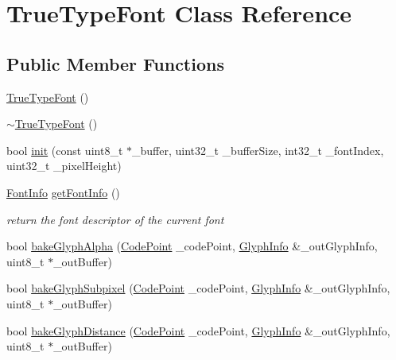 \hypertarget{class_true_type_font}{\section{True\+Type\+Font Class Reference}
\label{class_true_type_font}
}
\subsection*{Public Member Functions}
\begin{DoxyCompactItemize}
\item 
\hyperlink{class_true_type_font_ad32c45a5111d82794f1d8fe9d3a0f708}{True\+Type\+Font} ()
\item 
\hyperlink{class_true_type_font_a8a12b9e37d2cf9c494e49e0fa5335865}{$\sim$\+True\+Type\+Font} ()
\item 
bool \hyperlink{class_true_type_font_a47e4bdc35f4a09b9e6100b1dc325a5c9}{init} (const uint8\+\_\+t $\ast$\+\_\+buffer, uint32\+\_\+t \+\_\+buffer\+Size, int32\+\_\+t \+\_\+font\+Index, uint32\+\_\+t \+\_\+pixel\+Height)
\item 
\hyperlink{struct_font_info}{Font\+Info} \hyperlink{class_true_type_font_a68005356e6138ab8929b8d84c4674311}{get\+Font\+Info} ()
\begin{DoxyCompactList}\small\item\em return the font descriptor of the current font \end{DoxyCompactList}\item 
bool \hyperlink{class_true_type_font_aa71d2596ce6b22fa885dac09de3e8b7a}{bake\+Glyph\+Alpha} (\hyperlink{font__manager_8h_a1c37cd42ebdd07e09d01601a0989708e}{Code\+Point} \+\_\+code\+Point, \hyperlink{struct_glyph_info}{Glyph\+Info} \&\+\_\+out\+Glyph\+Info, uint8\+\_\+t $\ast$\+\_\+out\+Buffer)
\item 
bool \hyperlink{class_true_type_font_a203f18bb394ae944e1cfd872b46613da}{bake\+Glyph\+Subpixel} (\hyperlink{font__manager_8h_a1c37cd42ebdd07e09d01601a0989708e}{Code\+Point} \+\_\+code\+Point, \hyperlink{struct_glyph_info}{Glyph\+Info} \&\+\_\+out\+Glyph\+Info, uint8\+\_\+t $\ast$\+\_\+out\+Buffer)
\item 
bool \hyperlink{class_true_type_font_abf9ef5c6b5cd8d86256f5bd79fd3e2e1}{bake\+Glyph\+Distance} (\hyperlink{font__manager_8h_a1c37cd42ebdd07e09d01601a0989708e}{Code\+Point} \+\_\+code\+Point, \hyperlink{struct_glyph_info}{Glyph\+Info} \&\+\_\+out\+Glyph\+Info, uint8\+\_\+t $\ast$\+\_\+out\+Buffer)
\end{DoxyCompactItemize}


